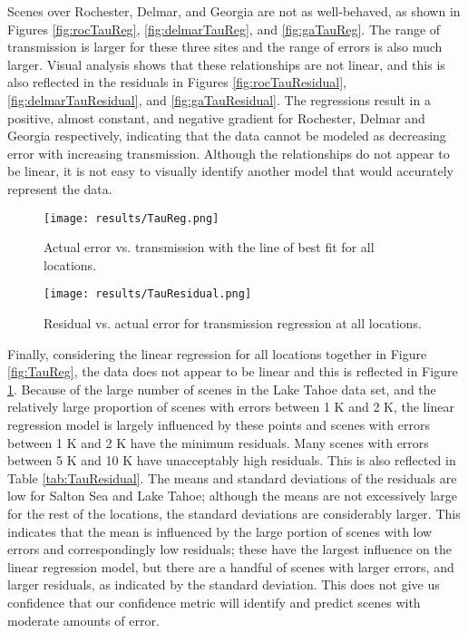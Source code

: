 \documentclass{book}
\begin{document}
Scenes over Rochester, Delmar, and Georgia are not as well-behaved, as shown in Figures \ref{fig:rocTauReg}, \ref{fig:delmarTauReg}, and \ref{fig:gaTauReg}.  The range of transmission is larger for these three sites and the range of errors is also much larger.  Visual analysis shows that these relationships are not linear, and this is also reflected in the residuals in Figures \ref{fig:rocTauResidual}, \ref{fig:delmarTauResidual}, and \ref{fig:gaTauResidual}.  The regressions result in a positive, almost constant, and negative gradient for Rochester, Delmar and Georgia respectively, indicating that the data cannot be modeled as decreasing error with increasing transmission.  Although the relationships do not appear to be linear, it is not easy to visually identify another model that would accurately represent the data.

\begin{figure}[H]
\begin{minipage}[b]{0.47\textwidth}
\centering
\texttt{[image: results/TauReg.png]}
\caption{Actual error vs. transmission with the line of best fit for all locations.}
\label{fig:TauReg}
\end{minipage}
\begin{minipage}[b]{0.47\textwidth}
\centering
\texttt{[image: results/TauResidual.png]}
\caption{Residual vs. actual error for transmission regression at all locations.}
\label{fig:TauResidual}
\end{minipage}
\end{figure}

Finally, considering the linear regression for all locations together in Figure \ref{fig:TauReg}, the data does not appear to be linear and this is reflected in Figure \ref{fig:TauResidual}.  Because of the large number of scenes in the Lake Tahoe data set, and the relatively large proportion of scenes with errors between 1 K and 2 K, the linear regression model is largely influenced by these points and scenes with errors between 1 K and 2 K have the minimum residuals.  Many scenes with errors between 5 K and 10 K have unacceptably high residuals.  This is also reflected in Table \ref{tab:TauResidual}.  The means and standard deviations of the residuals are low for Salton Sea and Lake Tahoe; although the means are not excessively large for the rest of the locations, the standard deviations are considerably larger.  This indicates that the mean is influenced by the large portion of scenes with low errors and correspondingly low residuals; these have the largest influence on the linear regression model, but there are a handful of scenes with larger errors, and larger residuals, as indicated by the standard deviation.  This does not give us confidence that our confidence metric will identify and predict scenes with moderate amounts of error.
\end{document}
